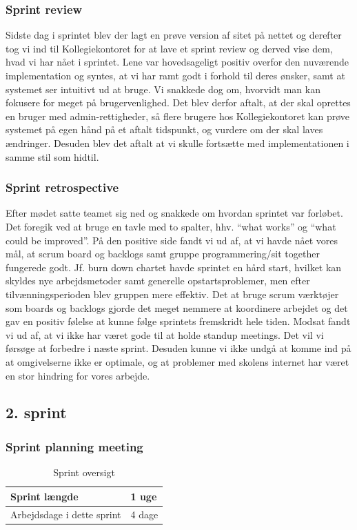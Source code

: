 \documentclass[12pt, a4paper]{report}
\begin{document}
\subsubsection{Sprint review}

Sidste dag i sprintet blev der lagt en prøve version af sitet på nettet og derefter tog vi ind til Kollegiekontoret for at lave et sprint review og derved vise dem, hvad vi har nået i sprintet. Lene var hovedsageligt positiv overfor den nuværende implementation og syntes, at vi har ramt godt i forhold til deres ønsker, samt at systemet ser intuitivt ud at bruge. Vi snakkede dog om, hvorvidt man kan fokusere for meget på brugervenlighed. Det blev derfor aftalt, at der skal oprettes en bruger med admin-rettigheder, så flere brugere hos Kollegiekontoret kan prøve systemet på egen hånd på et aftalt tidspunkt, og vurdere om der skal laves ændringer. Desuden blev det aftalt at vi skulle fortsætte med implementationen i samme stil som hidtil.

\subsubsection{Sprint retrospective}

Efter mødet satte teamet sig ned og snakkede om hvordan sprintet var forløbet. Det foregik ved at bruge en tavle med to spalter, hhv. “what works” og “what could be improved”. På den positive side fandt vi ud af, at vi havde nået vores mål, at scrum board og backlogs samt gruppe programmering/sit together fungerede godt. Jf. burn down chartet havde sprintet en hård start, hvilket kan skyldes nye arbejdsmetoder samt generelle opstartsproblemer, men efter tilvænningsperioden blev gruppen mere effektiv. Det at bruge scrum værktøjer som boards og backlogs gjorde det meget nemmere at koordinere arbejdet og det gav en positiv følelse at kunne følge sprintets fremskridt hele tiden. Modsat fandt vi ud af, at vi ikke har været gode til at holde standup meetings. Det vil vi førsøge at forbedre i næste sprint. Desuden kunne vi ikke undgå at komme ind på at omgivelserne ikke er optimale, og at problemer med skolens internet har været en stor hindring for vores arbejde.

\subsection{2. sprint}
\subsubsection{Sprint planning meeting}
\begin{table}[ht]
\caption{Sprint oversigt}
\label{sprint2oversigt}

\begin{tabular}{| l | l |}

\hline
Sprint længde & 1 uge \\ \hline
Arbejdsdage i dette sprint & 4 dage \\
\hline
\end{tabular}
\end{table}
\end{document}
